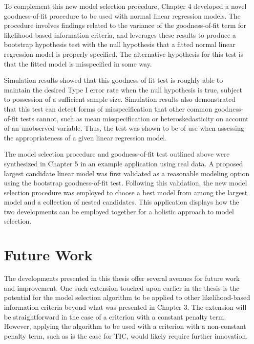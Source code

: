 		To complement this new model selection procedure, Chapter 4 developed a novel goodness-of-fit procedure to be used with normal linear regression models.
		The procedure involves findings related to the variance of the goodness-of-fit term for likelihood-based information criteria, and leverages these
		results to produce a bootstrap hypothesis test with the null hypothesis that a fitted normal linear regression model is properly specified. The alternative
		hypothesis for this test is that the fitted model is misspecified in some way.

		Simulation results showed that this goodness-of-fit test is roughly able to maintain the desired Type I error rate when the null hypothesis is true, subject
		to possession of a sufficient sample size. Simulation results also demonstrated that this test can detect forms of misspecification that other common
		goodness-of-fit tests cannot, such as mean misspecification or heteroskedasticity on account of an unobserved variable. Thus, the test was shown to be of use
		when assessing the appropriateness of a given linear regression model.

		The model selection procedure and goodness-of-fit test outlined above were synthesized in Chapter 5 in an example application using real data. A proposed
		largest candidate linear model was first validated as a reasonable modeling option using the bootstrap goodness-of-fit test. Following this validation, the new model selection
		procedure was employed to choose a best model from among the largest model and a collection of nested candidates. This application displays how the
		two developments can be employed together for a holistic approach to model selection.

		\section{Future Work}

		The developments presented in this thesis offer several avenues for future work and improvement. One such extension touched upon earlier in the thesis is the
		potential for the model selection algorithm to be applied to other likelihood-based information criteria beyond what was presented in Chapter 3. The extension
		will be straightforward in the case of a criterion with a constant penalty term. However, applying the algorithm to be used with a criterion with a non-constant penalty term,
		such as is the case for TIC, would likely require further innovation.

